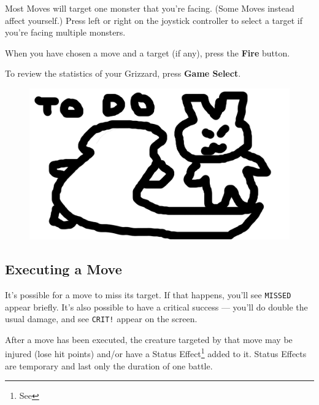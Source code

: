 \documentclass[10pt,twocolumn,openany,article]{memoir}
\begin{document}
Most  Moves will  target one  monster  that you're  facing. (Some  Moves
instead affect yourself.) Press left or right on the joystick controller
to select a target if you're facing multiple monsters.

When  you  have  chosen  a  move  and  a  target  (if  any),  press  the
\textbf{Fire} button. 

To review the statistics of your Grizzard, press \textbf{Game Select}.

\begin{figure}[b]
  \begin{center}
    \includegraphics[width=2\columnwidth,height=\columnwidth]{../Manual/GrizzardCombat.png}
  \end{center}
\end{figure}


\subsection{Executing a Move}

It's possible for a move to miss its target. If that happens, you'll see
\texttt{MISSED} appear  briefly. It's also  possible to have  a critical
success ---  you'll do double  the usual damage, and  see \texttt{CRIT!}
appear on the screen.

After a move  has been executed, the creature targeted  by that move may
be injured  (lose hit points)  and/or have a  Status Effect\footnote{See
  \pageref{sec:StatusEffects}} added to it.
Status Effects are temporary and last only the duration of one battle.
\end{document}
